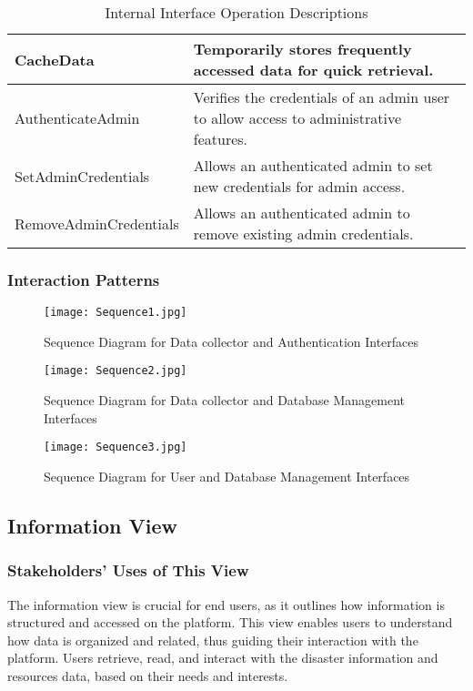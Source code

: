\documentclass[12pt, letterpaper]{article}
\begin{document}
\begin{table}[H]
\begin{tabular}{|l|p{10cm}|}
        \hline
        CacheData & Temporarily stores frequently accessed data for quick retrieval. \\
        \hline
        AuthenticateAdmin & Verifies the credentials of an admin user to allow access to administrative features. \\
        \hline
        SetAdminCredentials & Allows an authenticated admin to set new credentials for admin access. \\
        \hline
        RemoveAdminCredentials & Allows an authenticated admin to remove existing admin credentials. \\
        \hline
    \end{tabular}
    \caption{Internal Interface Operation Descriptions}
    \label{tab:operations}
\end{table}

\subsubsection{Interaction Patterns}

\begin{figure}[H]
\centering
\texttt{[image: Sequence1.jpg]}
\caption{Sequence Diagram for Data collector and Authentication Interfaces}
\end{figure}

\begin{figure}[H]
\centering
\texttt{[image: Sequence2.jpg]}
\caption{Sequence Diagram for Data collector and Database Management Interfaces}
\end{figure}

\begin{figure}[H]
\centering
\texttt{[image: Sequence3.jpg]}
\caption{Sequence Diagram for User and Database Management Interfaces}
\end{figure}

\newpage

\subsection{Information View}
\subsubsection{Stakeholders' Uses of This View}

The information view is crucial for end users, as it outlines how information is structured and accessed on the platform. This view enables users to understand how data is organized and related, thus guiding their interaction with the platform. Users retrieve, read, and interact with the disaster information and resources data, based on their needs and interests.
\end{document}
